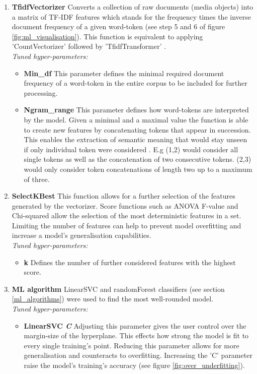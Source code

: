 \begin{enumerate}
    \item \textbf{TfidfVectorizer} Converts a collection of raw documents (media objects) into a matrix of TF-IDF features which stands for the frequency times the inverse document frequency of a given word-token (see step 5 and 6 of figure \ref{fig:ml_visualisation}). This function is equivalent to applying 'CountVectorizer' followed by 'TfidfTransformer' \parencite{Scikit-learn2018}.\\
    \textit{Tuned hyper-parameters:}
    \begin{itemize}[label={}]
        \item \textbf{Min\_df} This parameter defines the minimal required document frequency of a word-token in the entire corpus to be included for further processing.
        \item \textbf{Ngram\_range} This parameter defines how word-tokens are interpreted by the model. Given a minimal and a maximal value the function is able to create new features by concatenating tokens that appear in succession. This enables the extraction of semantic meaning that would stay unseen if only individual token were considered \parencite{Surtikanti2013}. E.g (1,2) would consider all single tokens as well as the concatenation of two consecutive tokens. (2,3) would only consider token concatenations of length two up to a maximum of three.
    \end{itemize}
    
    \item \textbf{SelectKBest} This function allows for a further selection of the features generated by the vectorizer. Score functions such as ANOVA F-value and Chi-squared allow the selection of the most deterministic features in a set. Limiting the number of features can help to prevent model overfitting and increase a model's generalisation capabilities.\\
    \textit{Tuned hyper-parameters:}
    \begin{itemize}[label={}]
        \item \textbf{k} Defines the number of further considered features with the highest score.
    \end{itemize}
    
    \item \textbf{ML algorithm} LinearSVC and randomForest classifiers (see section \ref{ml_algorithms}) were used to find the most well-rounded model.\\
    \textit{Tuned hyper-parameters:}
    \begin{itemize}[label={}]
        \item \textbf{LinearSVC \textit{C}} Adjusting this parameter gives the user control over the margin-size of the hyperplane. This effects how strong the model is fit to every single training's point. Reducing this parameter allows for more generalisation and counteracts to overfitting. Increasing the 'C' parameter raise the model's training's accuracy (see figure \ref{fig:over_underfitting}).
        

\end{itemize}
\end{enumerate}

